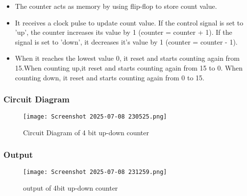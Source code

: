 \documentclass[12pt]{article}
\begin{document}
\begin{itemize}
    \item The counter acts as memory by using flip-flop to store count value.

    \item It receives a clock pulse to update count value. If the control signal is set to 'up', the counter increases its value by 1 (counter = counter + 1). If the signal is set to 'down', it decreases it's value by 1 (counter = counter - 1).

    \item When it reaches the lowest value 0, it reset and starts counting again from 15.When counting up,it reset and starts counting again from 15 to 0. When counting down, it reset and starts counting again from 0 to 15.
    
\end{itemize}



\subsubsection{Circuit Diagram}
\begin{figure}[H]
    \centering
    \texttt{[image: Screenshot 2025-07-08 230525.png]}
    \caption{Circuit Diagram of 4 bit up-down counter}
    \label{fig:enter-label}
\end{figure}


\subsubsection{Output}
\begin{figure}[H]
    \centering
    \texttt{[image: Screenshot 2025-07-08 231259.png]}
    \caption{output of 4bit up-down counter}
    \label{fig:enter-label}
\end{figure}
\end{document}
